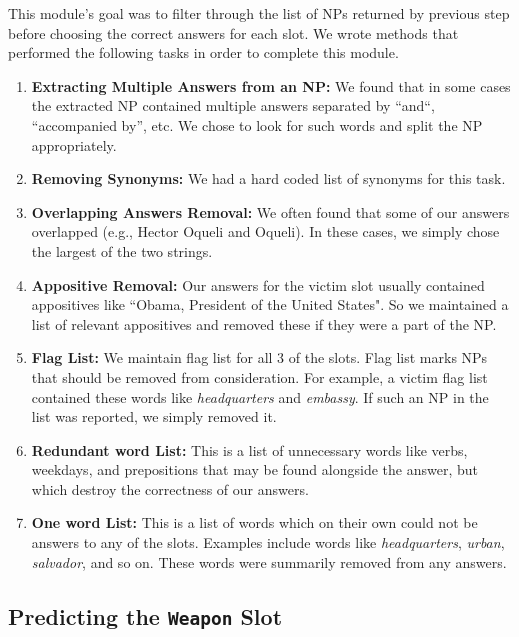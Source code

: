 \documentclass[11pt]{myclass}
\begin{document}
This module’s goal was to filter through the list of NPs returned by previous step before choosing the correct answers for each slot. We wrote methods that performed the following tasks in order to complete this module. 

\begin{enumerate}

\item \textbf{Extracting Multiple Answers from an NP:} We found that in some cases the extracted NP contained multiple answers separated by “and“, “accompanied by”, etc. We chose to look for such words and split the NP appropriately.

\item \textbf{Removing Synonyms:} We had a hard coded list of synonyms for this task. 

\item \textbf{Overlapping Answers Removal:} We often found that some of our answers overlapped (e.g., Hector Oqueli and Oqueli). In these cases, we simply chose the largest of the two strings.

\item \textbf{Appositive Removal:} Our answers for the victim slot usually contained appositives like ``Obama, President of the United States". So we maintained a list of relevant appositives and removed these if they were a part of the NP.

\item \textbf{Flag List:} We maintain flag list for all 3 of the slots. Flag list marks NPs that should be removed from consideration. For example, a victim flag list contained these words like \textit{headquarters} and \textit{embassy}. If such an NP in the list was reported, we simply removed it.

\item \textbf{Redundant word List:} This is a list of unnecessary words like verbs, weekdays, and prepositions that may be found alongside the answer, but which destroy the correctness of our answers.

\item \textbf{One word List:} This is a list of words which on their own could not be answers to any of the slots. Examples include words like \textit{headquarters}, \textit{urban}, \textit{salvador}, and so on. These words were summarily removed from any answers.

\end{enumerate}

\subsection{Predicting the \texttt{Weapon} Slot}
\end{document}
